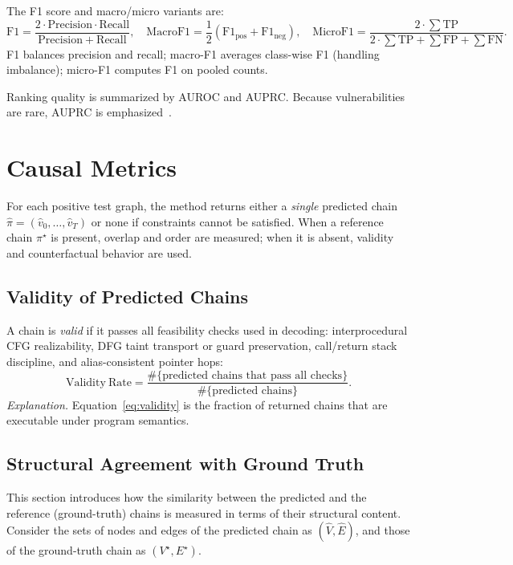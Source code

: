 \documentclass{buthesis}
\begin{document}
The F1 score and macro/micro variants are:
\begin{equation}
\label{eq:std-f1}
\mathrm{F1}=\frac{2\cdot \mathrm{Precision}\cdot \mathrm{Recall}}{\mathrm{Precision}+\mathrm{Recall}},\quad
\mathrm{MacroF1}=\frac{1} {2}\left(\mathrm{F1}_{\text{pos}}+\mathrm{F1}_{\text{neg}}\right),
\quad\mathrm{MicroF1}=\frac{2\cdot \sum\mathrm{TP}}{2\cdot \sum\mathrm{TP}+\sum\mathrm{FP}+\sum\mathrm{FN}}.
\end{equation}
F1 balances precision and recall; macro-F1 averages class-wise F1 (handling imbalance); micro-F1 computes F1 on pooled counts.

Ranking quality is summarized by AUROC and AUPRC. Because vulnerabilities are rare, AUPRC is emphasized~\cite{Li2022Empirical}.

\section{Causal Metrics}
\label{sec:eval-causal}

For each positive test graph, the method returns either a \emph{single} predicted chain \(\hat{\pi}=(\hat{v}_0,\dots,\hat{v}_T)\) or none if constraints cannot be satisfied. When a reference chain \(\pi^\star\) is present, overlap and order are measured; when it is absent, validity and counterfactual behavior are used.

\subsection{Validity of Predicted Chains}
\label{subsec:validity}
A chain is \emph{valid} if it passes all feasibility checks used in decoding: interprocedural CFG realizability, DFG taint transport or guard preservation, call/return stack discipline, and alias-consistent pointer hops:
\begin{equation}
\label{eq:validity}
\mathrm{Validity\ Rate}
=\frac{\#\{\text{predicted chains that pass all checks}\}}
{\#\{\text{predicted chains}\}}.
\end{equation}
\textit{Explanation.} Equation~\eqref{eq:validity} is the fraction of returned chains that are executable under program semantics.

\subsection{Structural Agreement with Ground Truth}
\label{subsec:struct-agree}

This section introduces how the similarity between the predicted and the reference (ground-truth) chains is measured in terms of their structural content. Consider the sets of nodes and edges of the predicted chain as \((\hat{V}, \hat{E})\), and those of the ground-truth chain as \((V^\star, E^\star)\).
\end{document}
